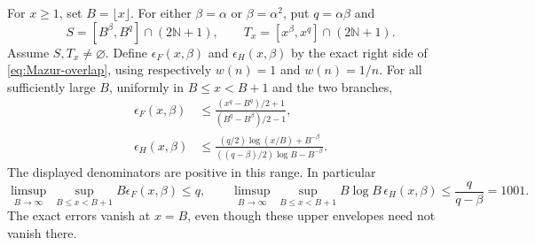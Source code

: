 \begin{proposition}
\label{prop:Mazur-real-overlap}
For \(x\ge1\), set \(B=\lfloor x\rfloor\). For either
\(\beta=\alpha\) or \(\beta=\alpha^2\), put \(q=\alpha\beta\) and
\[
 S=[B^\beta,B^q]\cap(2\mathbb N+1),\qquad
 T_x=[x^\beta,x^q]\cap(2\mathbb N+1).
\]
Assume \(S,T_x\ne\varnothing\). Define \(\epsilon_F(x,\beta)\) and
\(\epsilon_H(x,\beta)\) by the exact right side of
\eqref{eq:Mazur-overlap}, using respectively \(w(n)=1\) and \(w(n)=1/n\).
For all sufficiently large \(B\), uniformly in \(B\le x<B+1\) and
the two branches,
\begin{align}
 \epsilon_F(x,\beta)
 &\le
 \frac{(x^q-B^q)/2+1}{(B^q-B^\beta)/2-1},
 \label{eq:Mazur-real-flat}\\
 \epsilon_H(x,\beta)
 &\le
 \frac{(q/2)\log(x/B)+B^{-\beta}}
      {((q-\beta)/2)\log B-B^{-\beta}}.
 \label{eq:Mazur-real-harmonic}
\end{align}
The displayed denominators are positive in this range.
In particular
\[
 \limsup_{B\to\infty}\ \sup_{B\le x<B+1} B\epsilon_F(x,\beta)\le q,
 \qquad
 \limsup_{B\to\infty}\ \sup_{B\le x<B+1}
 B\log B\,\epsilon_H(x,\beta)\le
 \frac{q}{q-\beta}=1001.
\]
The exact errors vanish at \(x=B\), even though these upper envelopes
need not vanish there.
\end{proposition}
